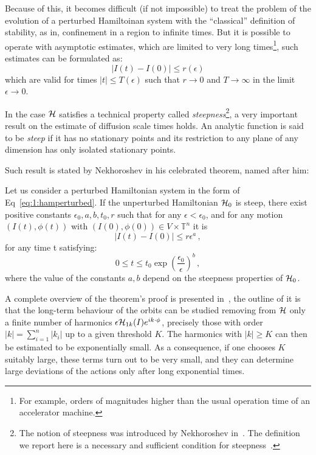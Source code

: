 Because of this, it becomes difficult (if not impossible) to treat the problem of the evolution of a perturbed Hamiltoinan system with the ``classical'' definition of stability, as in, confinement in a region to infinite times. But it is possible to operate with asymptotic estimates, which are limited to very long times\footnote{For example, orders of magnitudes higher than the usual operation time of an accelerator machine.}, such estimates can be formulated as:
\begin{equation}
    |I(t)-I(0)| \leq r(\epsilon)
\end{equation}
which are valid for times $|t| \leq T(\epsilon)$ such that $r \rightarrow 0$ and $T \rightarrow \infty$ in the limit $\epsilon \rightarrow 0$. 

In the case $\mathcal{H}$ satisfies a technical property called \textit{steepness}\footnote{The notion of steepness was introduced by Nekhoroshev in~\cite{N_N_Nehorošev_1973}. The definition we report here is a necessary and sufficient condition for steepness~\cite{AIF_2006__56_3_795_0}.}, a very important result on the estimate of diffusion scale times holds. An analytic function is said to be \textit{steep} if it has no stationary points and its restriction to any plane of any dimension has only isolated stationary points.

Such result is stated by Nekhoroshev in his celebrated theorem, named after him:
\begin{theorem}
    Let us consider a perturbed Hamiltonian system in the form of Eq~\eqref{eq:1:hamperturbed}. If the unperturbed Hamiltonian $\mathcal{H}_0$ is steep, there exist positive constants $\epsilon_0, a, b, t_0, r$ such that for any $\epsilon<\epsilon_0$, and for any motion $(I(t), \phi(t))$ with $(I(0), \phi(0)) \in V \times \mathbb{T}^n$ it is
    \begin{equation}
        |I(t)-I(0)| \leq r \epsilon^a \,,
    \end{equation}
    for any time t satisfying:
    \begin{equation}
        0 \leq t \leq t_0 \exp \left(\frac{\epsilon_0}{\epsilon}\right)^b \,,  
    \end{equation}
    where the value of the constants $a, b$ depend on the steepness properties of $\mathcal{H}_0$.
\end{theorem}

A complete overview of the theorem's proof is presented in~\cite{Guzzo2007}, the outline of it is that the long-term behaviour of the orbits can be studied removing from $\mathcal{H}$ only a finite number of harmonics $\epsilon \mathcal{H}_{1k}(I) e^{i k \cdot \phi}$, precisely those with order $|k|=\sum_{i=1}^n\left|k_i\right|$ up to a given threshold $K$. The harmonics with $|k| \geq K$ can then be estimated to be exponentially small. As a consequence, if one chooses $K$ suitably large, these terms turn out to be very small, and they can determine large deviations of the actions only after long exponential times.

